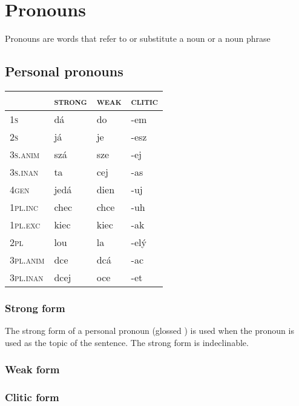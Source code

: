 \chapter{Pronouns}

Pronouns are words that refer to or substitute a noun or a noun phrase

\section{Personal pronouns}

\begin{table}[h!]
	\centering \footnotesize
	\begin{tabularx}{0.7\textwidth}{>{\scshape}YMMM}
		\toprule
		 &\textsc{strong} &\textsc{weak}&\textsc{clitic}\\
		\midrule
		1s &dá&do&-em\\ \addlinespace
		2s&já&je&-esz\\ \addlinespace
		3s.anim&szá&sze&-ej\\ \addlinespace
		3s.inan&ta&cej&-as\\ \addlinespace
		4gen&jedá&dien&-uj\\ \addlinespace
		1pl.inc&chec&chce&-uh\\ \addlinespace
		1pl.exc&kiec&kiec&-ak\\ \addlinespace
		2pl&lou&la&-elý\\ \addlinespace
		3pl.anim&dce&dcá&-ac\\ \addlinespace
		3pl.inan&dcej&oce&-et\\ \bottomrule
	\end{tabularx}
\end{table}

\subsection{Strong form}

The strong form of a personal pronoun (glossed ) is used when the pronoun is used as the topic of the sentence. The strong form is indeclinable.

\subsection{Weak form}

\subsection{Clitic form}

